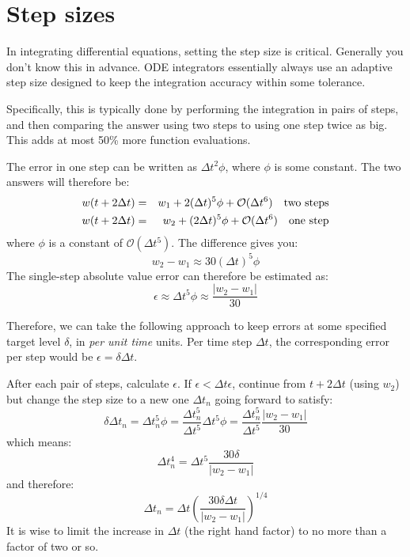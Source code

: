 \section{Step sizes}

In integrating differential equations, setting the step size is
critical. Generally you don't know this in advance. ODE integrators
essentially always use an adaptive step size designed to keep the
integration accuracy within some tolerance.

Specifically, this is typically done by performing the integration in
pairs of steps, and then comparing the answer using two steps to using
one step twice as big. This adds at most 50\% more function
evaluations.

The error in one step can be written as $\Delta t^2 \phi$, where
$\phi$ is some constant.
The two answers will therefore be:
\begin{eqnarray}
w(t+ 2\Delta t) &=& w_1 + 2 (\Delta t)^5 \phi + \mathcal{O}(\Delta
t^6) \quad\mathrm{two~steps} 
\cr
w(t+ 2\Delta t) &=& w_2 + (2\Delta t)^5 \phi + \mathcal{O}(\Delta t^6)
\quad\mathrm{one~step} 
\end{eqnarray}
where $\phi$ is a constant of $\mathcal{O}(\Delta t^5)$. The
difference gives you:
\begin{equation}
w_2 - w_1 \approx 30 (\Delta t)^5 \phi
\end{equation}
The single-step absolute value error can therefore be estimated as:
\begin{equation}
\epsilon \approx \Delta t^5 \phi \approx \frac{\left|w_2 -
  w_1\right|}{30}
\end{equation}

Therefore, we can take the following approach to keep errors at some
specified target level $\delta$, in {\it per unit time} units. Per
time step $\Delta t$, the corresponding error per step would be
$\epsilon = \delta\Delta t$.

After each pair of steps, calculate $\epsilon$. If $\epsilon < \Delta
t \epsilon$, continue from $t+ 2\Delta t$ (using $w_2$) but change the
step size to a new one $\Delta t_n$ going forward to satisfy:
\begin{equation}
  \delta \Delta t_n = \Delta t_n^5 \phi
  = \frac{\Delta t_n^5}{\Delta t^5} \Delta t^5 \phi
  = \frac{\Delta t_n^5}{\Delta t^5} \frac{\left|w_2 - w_1\right|}{30}
\end{equation}
which means:
\begin{equation}
\Delta t_n^4 = \Delta t^5 \frac{30 \delta}{\left|w_2 - w_1\right|}
\end{equation}
and therefore:
\begin{equation}
\Delta t_n = \Delta t \left(\frac{30 \delta \Delta t}{\left|w_2 -
  w_1\right|}\right)^{1/4}
\end{equation}
It is wise to limit the increase in $\Delta t$ (the right hand factor)
to no more than a factor of two or so.

